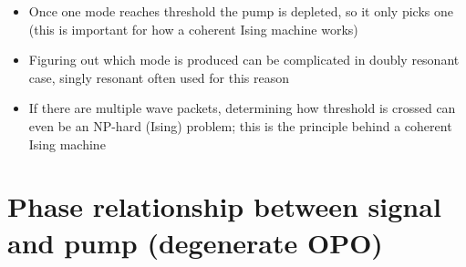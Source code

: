 \documentclass[english]{article}
\begin{document}
\begin{itemize}
\begin{itemize}
\item Once one mode reaches threshold the pump is depleted, so it only picks one (this is important for how a coherent Ising machine works)
\item Figuring out which mode is produced can be complicated in doubly resonant case, singly resonant often used for this reason
\item If there are multiple wave packets, determining how threshold is crossed can even be an NP-hard (Ising) problem; this is the principle behind a coherent Ising machine 
\end{itemize}
\end{itemize}

\section{Phase relationship between signal and pump (degenerate OPO)}
\end{document}

